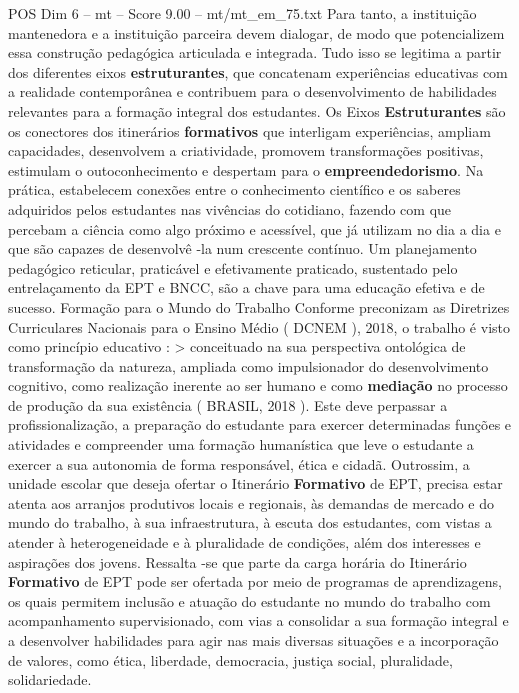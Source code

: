 \begin{textsample}{POS Dim 6 – mt – Score 9.00 – mt/mt\_em\_75.txt}
Para tanto, a instituição mantenedora e a instituição parceira devem dialogar, de modo que potencializem essa construção pedagógica articulada e integrada.
Tudo isso se legitima a partir dos diferentes eixos \textbf{estruturantes}, que concatenam experiências educativas com a realidade contemporânea e contribuem para o desenvolvimento de habilidades relevantes para a formação integral dos estudantes.
Os Eixos \textbf{Estruturantes} são os conectores dos itinerários \textbf{formativos} que interligam experiências, ampliam capacidades, desenvolvem a criatividade, promovem transformações positivas, estimulam o outoconhecimento e despertam para o \textbf{empreendedorismo}.
Na prática, estabelecem conexões entre o conhecimento científico e os saberes adquiridos pelos estudantes nas vivências do cotidiano, fazendo com que percebam a ciência como algo próximo e acessível, que já utilizam no dia a dia e que são capazes de desenvolvê -la num crescente contínuo.
Um planejamento pedagógico reticular, praticável e efetivamente praticado, sustentado pelo entrelaçamento da EPT e BNCC, são a chave para uma educação efetiva e de sucesso.
Formação para o Mundo do Trabalho Conforme preconizam as Diretrizes Curriculares Nacionais para o Ensino Médio ( DCNEM ), 2018, o trabalho é visto como princípio educativo : > conceituado na sua perspectiva ontológica de transformação da natureza, ampliada como impulsionador do desenvolvimento cognitivo, como realização inerente ao ser humano e como \textbf{mediação} no processo de produção da sua existência ( BRASIL, 2018 ).
Este deve perpassar a profissionalização, a preparação do estudante para exercer determinadas funções e atividades e compreender uma formação humanística que leve o estudante a exercer a sua autonomia de forma responsável, ética e cidadã.
Outrossim, a unidade escolar que deseja ofertar o Itinerário \textbf{Formativo} de EPT, precisa estar atenta aos arranjos produtivos locais e regionais, às demandas de mercado e do mundo do trabalho, à sua infraestrutura, à escuta dos estudantes, com vistas a atender à heterogeneidade e à pluralidade de condições, além dos interesses e aspirações dos jovens.
Ressalta -se que parte da carga horária do Itinerário \textbf{Formativo} de EPT pode ser ofertada por meio de programas de aprendizagens, os quais permitem inclusão e atuação do estudante no mundo do trabalho com acompanhamento supervisionado, com vias a consolidar a sua formação integral e a desenvolver habilidades para agir nas mais diversas situações e a incorporação de valores, como ética, liberdade, democracia, justiça social, pluralidade, solidariedade.

\end{textsample}
